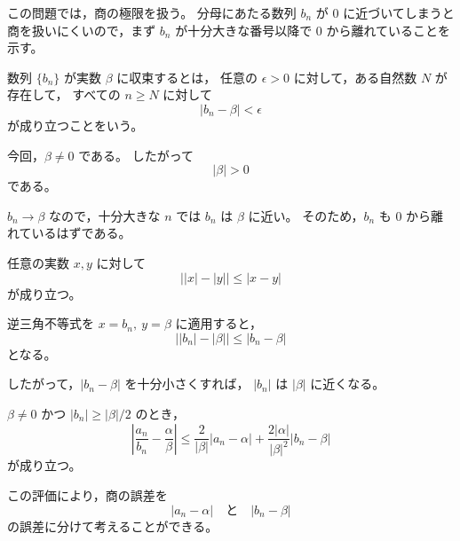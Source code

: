 \begin{background}
	この問題では，商の極限を扱う。
	分母にあたる数列 $b_n$ が $0$ に近づいてしまうと
	商を扱いにくいので，まず $b_n$ が十分大きな番号以降で
	$0$ から離れていることを示す。

	\begin{definition}[数列の収束]
		数列 $\{b_n\}$ が実数 $\beta$ に収束するとは，
		任意の $\epsilon>0$ に対して，ある自然数 $N$ が存在して，
		すべての $n\geq N$ に対して
		\[
			|b_n-\beta|<\epsilon
		\]
		が成り立つことをいう。
	\end{definition}

	\begin{remark}
		今回，$\beta\neq 0$ である。
		したがって
		\[
			|\beta|>0
		\]
		である。

		$b_n\to\beta$ なので，十分大きな $n$ では
		$b_n$ は $\beta$ に近い。
		そのため，$b_n$ も $0$ から離れているはずである。
	\end{remark}

	\begin{lemma}[逆三角不等式]
		任意の実数 $x,y$ に対して
		\[
			\bigl||x|-|y|\bigr|\leq |x-y|
		\]
		が成り立つ。
	\end{lemma}

	\begin{remark}
		逆三角不等式を $x=b_n,\ y=\beta$ に適用すると，
		\[
			\bigl||b_n|-|\beta|\bigr|
			\leq |b_n-\beta|
		\]
		となる。

		したがって，$|b_n-\beta|$ を十分小さくすれば，
		$|b_n|$ は $|\beta|$ に近くなる。
	\end{remark}

	\begin{lemma}[商の誤差評価]
		$\beta\neq 0$ かつ $|b_n|\geq |\beta|/2$ のとき，
		\[
			\left|
				\frac{a_n}{b_n}
				-
				\frac{\alpha}{\beta}
			\right|
			\leq
			\frac{2}{|\beta|}|a_n-\alpha|
			+
			\frac{2|\alpha|}{|\beta|^2}|b_n-\beta|
		\]
		が成り立つ。
	\end{lemma}

	\begin{remark}
		この評価により，商の誤差を
		\[
			|a_n-\alpha|
			\quad\text{と}\quad
			|b_n-\beta|
		\]
		の誤差に分けて考えることができる。
	\end{remark}
\end{background}
